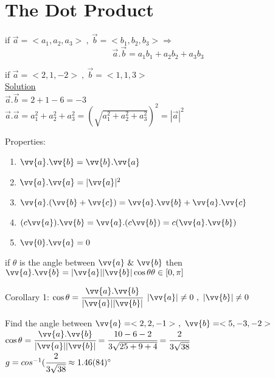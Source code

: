 \section{The Dot Product}
\begin{definition}
if $\overrightarrow{a}=<a_1,a_2,a_3>~,~\overrightarrow{b}=<b_1,b_2,b_3>\Rightarrow$
$$\overrightarrow{a}.\overrightarrow{b}=a_1b_1+a_2b_2+a_3b_3$$
\end{definition} 
\begin{example}
if $\overrightarrow{a}=<2,1,-2>~,~\overrightarrow{b}=<1,1,3>$\\
{\color{smalt(darkpowderblue)}\underline{Solution}}\\
$\overrightarrow{a}.\overrightarrow{b}=2+1-6=-3$\\
$\overrightarrow{a}.\overrightarrow{a}=a_1^2+a_2^2+a_3^2=(\sqrt{a_1^2+a_2^2+a_3^2})^2=|\overrightarrow{a}|^2$
\end{example}
\noindent{\color{smalt(darkpowderblue)}\rule{\linewidth}{.2mm}}
{\color{smalt(darkpowderblue)}Properties:}
\begin{enumerate}
    \item $\vv{a}.\vv{b}=\vv{b}.\vv{a}$
    \item $\vv{a}.\vv{a}=|\vv{a}|^2$
    \item $\vv{a}.(\vv{b}+\vv{c})=\vv{a}.\vv{b}+\vv{a}.\vv{c}$
    \item $(c\vv{a}).\vv{b}=\vv{a}.(c\vv{b})=c(\vv{a}.\vv{b})$
    \item $\vv{0}.\vv{a}=0$
\end{enumerate}
\begin{theorem}
if $\theta$ is the angle between $\vv{a}~\&~\vv{b}$ then $\vv{a}.\vv{b}=|\vv{a}||\vv{b}|\cos\theta\\
\theta\in[0,\pi]$
\end{theorem}
{\color{smalt(darkpowderblue)}Corollary 1:}
$\cos{\theta}=\cfrac{\vv{a}.\vv{b}}{|\vv{a}||\vv{b}|}$ $|\vv{a}|\neq0~,~|\vv{b}|\neq0$\\
\begin{example}
Find the angle between $\vv{a}=<2,2,-1>~,~\vv{b}=<5,-3,-2>$\\
$\cos{\theta}=\cfrac{\vv{a}.\vv{b}}{|\vv{a}||\vv{b}|}=\cfrac{10-6-2}{3\sqrt{25+9+4}}=\cfrac{2}{3\sqrt{38}}$\\
$g=cos^{-1}(\cfrac{2}{3\sqrt{38}}\approx 1.46(84)^\circ$
\end{example}
